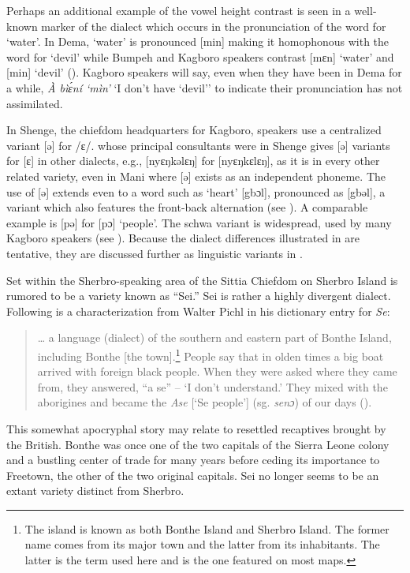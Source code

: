 Perhaps an additional example of the vowel height contrast is seen in a well-known marker of the dialect which occurs in the pronunciation of the word for ‘water'. In Dema, ‘water' is pronounced [min] making it homophonous with the word for ‘devil' while Bumpeh and Kagboro speakers contrast [mɛn] ‘water' and [min] ‘devil'  (). Kagboro speakers will say, even when they have been in Dema for a while, \textit{À bìɛ́ní ‘mìn'} ‘I don't have ‘devil'' to indicate their pronunciation has not assimilated.
 
In Shenge, the chiefdom headquarters for Kagboro, speakers use a centralized variant [ə] for /ɛ/. \citet{Pichl1967}whose principal consultants were in Shenge gives [ə] variants for [ɛ] in other dialects, e.g., [nyɛŋkəlɛŋ] for [nyɛŋkɛlɛŋ], as it is in every other related variety, even in Mani where [ə] exists as an independent phoneme. The use of [ə] extends even to a word such as ‘heart' [gbɔl], pronounced as [gbəl], a variant which also features the front-back alternation (see ). A comparable example is [pə] for [pɔ] ‘people'. The schwa variant is widespread, used by many Kagboro speakers (see ). Because the dialect differences illustrated in  are tentative, they are discussed further as linguistic variants in .

Set within the Sherbro-speaking area of the Sittia Chiefdom on Sherbro Island is rumored to be a variety known as “Sei.” Sei is rather a highly divergent dialect. Following is a characterization from Walter Pichl in his dictionary entry for \textit{Se}:
\begin{quote}
    … a language (dialect) of the southern and eastern part of Bonthe Island, including Bonthe [the town].\footnote{The island is known as both Bonthe Island and Sherbro Island. The former name comes from its major town and the latter from its inhabitants. The latter is the term used here and is the one featured on most maps.} People say that in olden times a big boat arrived with foreign black people. When they were asked where they came from, they answered, “a se” – ‘I don't understand.' They mixed with the aborigines and became the \textit{Ase} [‘Se people'] (sg. \textit{senɔ}) of our days (\citealt[82]{Pichl1967}).
\end{quote}
    
This somewhat apocryphal story may relate to resettled recaptives brought by the British. Bonthe was once one of the two capitals of the Sierra Leone colony and a bustling center of trade for many years before ceding its importance to Freetown, the other of the two original capitals. Sei no longer seems to be an extant variety distinct from Sherbro.

